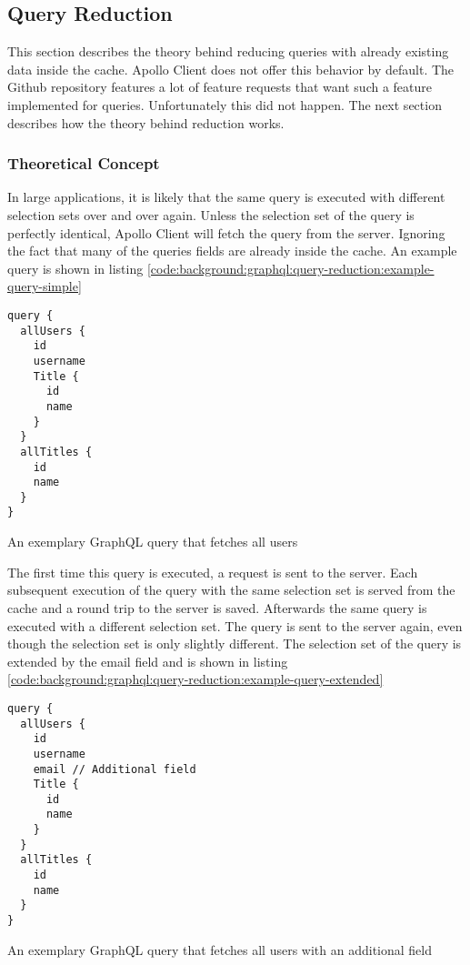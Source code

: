 \subsection{Query Reduction}

This section describes the theory behind reducing queries with already existing data inside the cache. Apollo Client does not offer this behavior by default. The Github repository features a lot of feature requests that want such a feature implemented for queries. Unfortunately this did not happen. The next section describes how the theory behind reduction works.

\subsubsection{Theoretical Concept}

In large applications, it is likely that the same query is executed with different selection sets over and over again. Unless the selection set of the query is perfectly identical, Apollo Client will fetch the query from the server. Ignoring the fact that many of the queries fields are already inside the cache. An example query is shown in listing \ref{code:background:graphql:query-reduction:example-query-simple}

\ifshowListings
\begin{listing}[H]
\begin{verbatim}
query {
  allUsers {
    id
    username
    Title {
      id
      name
    }
  }
  allTitles {
    id
    name
  }
}
\end{verbatim}
\caption{An exemplary GraphQL query that fetches all users}\label{code:background:graphql:query-reduction:example-query-simple}
\end{listing}
\fi

The first time this query is executed, a request is sent to the server. Each subsequent execution of the query with the same selection set is served from the cache and a round trip to the server is saved. Afterwards the same query is executed with a different selection set. The query is sent to the server again, even though the selection set is only slightly different. The selection set of the query is extended by the email field and is shown in listing \ref{code:background:graphql:query-reduction:example-query-extended}

\ifshowListings
\begin{listing}[H]
\begin{verbatim}
query {
  allUsers {
    id
    username
    email // Additional field
    Title {
      id
      name
    }
  }
  allTitles {
    id
    name
  }
}
\end{verbatim}
\caption{An exemplary GraphQL query that fetches all users with an additional field}\label{code:background:graphql:query-reduction:example-query-extended}
\end{listing}
\fi

